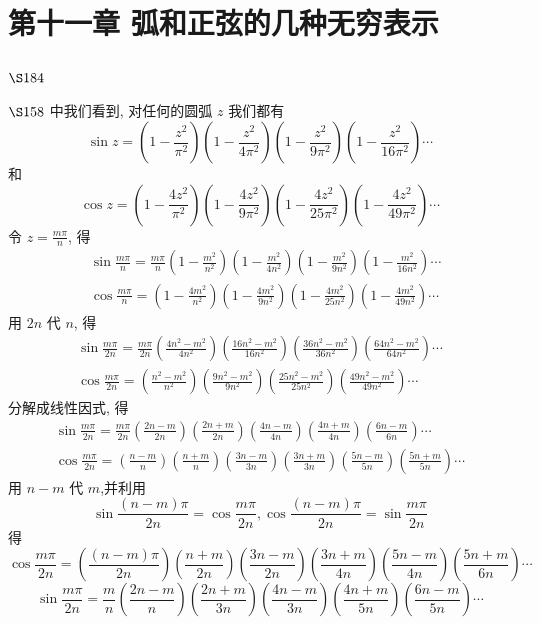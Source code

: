 \chapter{第十一章 弧和正弦的几种无穷表示}

\section{$\S 184$}

$\S 158$ 中我们看到, 对任何的圆弧 $z$ 我们都有
\[
\sin z=\left(1-\frac{z^{2}}{\pi^{2}}\right)\left(1-\frac{z^{2}}{4 \pi^{2}}\right)\left(1-\frac{z^{2}}{9 \pi^{2}}\right)\left(1-\frac{z^{2}}{16 \pi^{2}}\right) \cdots
\]
和
\[
\cos z=\left(1-\frac{4 z^{2}}{\pi^{2}}\right)\left(1-\frac{4 z^{2}}{9 \pi^{2}}\right)\left(1-\frac{4 z^{2}}{25 \pi^{2}}\right)\left(1-\frac{4 z^{2}}{49 \pi^{2}}\right) \cdots
\]
令 $z=\frac{m \pi}{n}$, 得
\[
\begin{aligned}
& \sin \frac{m \pi}{n}=\frac{m \pi}{n}\left(1-\frac{m^{2}}{n^{2}}\right)\left(1-\frac{m^{2}}{4 n^{2}}\right)\left(1-\frac{m^{2}}{9 n^{2}}\right)\left(1-\frac{m^{2}}{16 n^{2}}\right) \cdots \\
& \cos \frac{m \pi}{n}=\left(1-\frac{4 m^{2}}{n^{2}}\right)\left(1-\frac{4 m^{2}}{9 n^{2}}\right)\left(1-\frac{4 m^{2}}{25 n^{2}}\right)\left(1-\frac{4 m^{2}}{49 n^{2}}\right) \cdots
\end{aligned}
\]
用 $2 n$ 代 $n$, 得
\[
\begin{gathered}
\sin \frac{m \pi}{2 n}=\frac{m \pi}{2 n}\left(\frac{4 n^{2}-m^{2}}{4 n^{2}}\right)\left(\frac{16 n^{2}-m^{2}}{16 n^{2}}\right)\left(\frac{36 n^{2}-m^{2}}{36 n^{2}}\right)\left(\frac{64 n^{2}-m^{2}}{64 n^{2}}\right) \cdots \\
\cos \frac{m \pi}{2 n}=\left(\frac{n^{2}-m^{2}}{n^{2}}\right)\left(\frac{9 n^{2}-m^{2}}{9 n^{2}}\right)\left(\frac{25 n^{2}-m^{2}}{25 n^{2}}\right)\left(\frac{49 n^{2}-m^{2}}{49 n^{2}}\right) \cdots
\end{gathered}
\]
分解成线性因式, 得
\[
\begin{gathered}
\sin \frac{m \pi}{2 n}=\frac{m \pi}{2 n}\left(\frac{2 n-m}{2 n}\right)\left(\frac{2 n+m}{2 n}\right)\left(\frac{4 n-m}{4 n}\right)\left(\frac{4 n+m}{4 n}\right)\left(\frac{6 n-m}{6 n}\right) \cdots \\
\cos \frac{m \pi}{2 n}=\left(\frac{n-m}{n}\right)\left(\frac{n+m}{n}\right)\left(\frac{3 n-m}{3 n}\right)\left(\frac{3 n+m}{3 n}\right)\left(\frac{5 n-m}{5 n}\right)\left(\frac{5 n+m}{5 n}\right) \cdots
\end{gathered}
\]
用 $n-m$ 代 $m$,并利用
\[
\sin \frac{(n-m) \pi}{2 n}=\cos \frac{m \pi}{2 n}, \cos \frac{(n-m) \pi}{2 n}=\sin \frac{m \pi}{2 n}
\]
得
\[
\cos \frac{m \pi}{2 n}=\left(\frac{(n-m) \pi}{2 n}\right)\left(\frac{n+m}{2 n}\right)\left(\frac{3 n-m}{2 n}\right)\left(\frac{3 n+m}{4 n}\right)\left(\frac{5 n-m}{4 n}\right)\left(\frac{5 n+m}{6 n}\right) \cdots
\]
\[
 \sin \frac{m \pi}{2 n}=\frac{m}{n}\left(\frac{2 n-m}{n}\right)\left(\frac{2 n+m}{3 n}\right)\left(\frac{4 n-m}{3 n}\right)\left(\frac{4 n+m}{5 n}\right)\left(\frac{6 n-m}{5 n}\right) \cdots
\]
